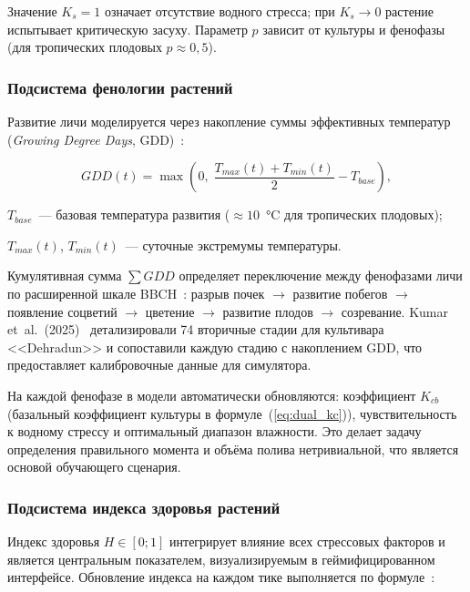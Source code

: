 \indent Значение $K_s = 1$ означает отсутствие водного стресса; при
$K_s \to 0$ растение испытывает критическую засуху. Параметр
$p$ зависит от культуры и фенофазы (для тропических плодовых
$p \approx 0{,}5$).

\subsubsection{Подсистема фенологии растений}

Развитие личи моделируется через накопление суммы эффективных
температур (\emph{Growing Degree Days},
GDD)~\cite{wikipedia_gdd,bygl2024_gdd_phenology}:

\begin{equation}
	GDD(t) = \max\!\left(0, \;\frac{T_{max}(t) + T_{min}(t)}{2} - T_{base}\right),
	\label{eq:gdd}
\end{equation}

\begin{where}
	\item $T_{base}$~--- базовая температура развития ($\approx 10$~°C для тропических плодовых);
	\item $T_{max}(t)$, $T_{min}(t)$~--- суточные экстремумы температуры.
\end{where}

Кумулятивная сумма $\sum GDD$ определяет переключение между
фенофазами личи по расширенной шкале
BBCH~\cite{wei2013_litchi_bbch}: разрыв почек $\to$ развитие
побегов $\to$ появление соцветий $\to$ цветение $\to$ развитие
плодов $\to$ созревание. Kumar et~al.~(2025)~\cite{kumar2025_litchi_growth}
детализировали 74 вторичные стадии для культивара <<Dehradun>>
и сопоставили каждую стадию с накоплением GDD, что предоставляет
калибровочные данные для симулятора.

На каждой фенофазе в модели автоматически обновляются:
коэффициент $K_{cb}$ (базальный коэффициент культуры в
формуле~(\ref{eq:dual_kc})), чувствительность к водному
стрессу и оптимальный диапазон влажности. Это делает задачу
определения правильного момента и объёма полива нетривиальной,
что является основой обучающего сценария.

\subsubsection{Подсистема индекса здоровья растений}

Индекс здоровья $H \in [0; 1]$ интегрирует влияние всех
стрессовых факторов и является центральным показателем,
визуализируемым в геймифицированном интерфейсе. Обновление
индекса на каждом тике выполняется по
формуле~\cite{shaw2015_waterlogging,liu2020_waterlogging_review,
	raes2023_aquacrop_ch3}:

